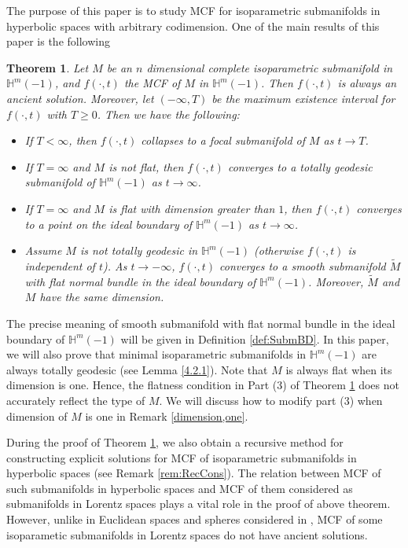 \documentclass[12pt]{article}
\newtheorem{thm}[lem]{Theorem}
\begin{document}
The purpose of this paper is to study MCF for isoparametric submanifolds in hyperbolic spaces with arbitrary codimension.
One of the  main results of this paper is the following

\begin{thm} \label{1.17}
  	Let $M$ be an $n$ dimensional complete  isoparametric submanifold in $\mathbb{H}^{m}(-1)$, and $f(\cdot,t)$ the  MCF of $M$ in $\mathbb{H}^{m}(-1)$. Then $f(\cdot,t)$ is always an ancient solution. Moreover, let $(-\infty,T)$ be the maximum existence interval for $f(\cdot,t)$ with
   $T \geq 0$. Then we have the following:
\begin{itemize}
\item[(1)] If $T< \infty$, then $f(\cdot,t)$ collapses to a focal submanifold of $M$  as $t\rightarrow T$.


\item[(2)] If $T= \infty$ and $M$ is not flat, then $f(\cdot,t)$ converges to a totally geodesic  submanifold of $\mathbb H^{m}(-1)$ as $t\rightarrow \infty$.


\item[(3)]
  If $T= \infty$ and $M$ is flat with dimension greater than $1$, then $f(\cdot,t)$ converges to a point on the ideal boundary of $\mathbb{H}^{m}(-1)$ as $t\rightarrow \infty$.



\item[(4)] Assume $M$ is not totally geodesic in $\mathbb{H}^m(-1)$ (otherwise $f(\cdot,t)$  is independent of $t$). As $t\rightarrow-\infty$, $f(\cdot,t)$ converges to a smooth submanifold  $\widetilde M$ with flat normal bundle in the ideal boundary of $\mathbb{H}^{m}(-1)$. Moreover, $\widetilde M$ and $M$ have the same dimension.
\end{itemize}
\end{thm}


\noindent
The precise meaning of smooth submanifold with flat normal bundle in the ideal boundary of $\mathbb{H}^{m}(-1)$ will be given in Definition \ref{def:SubmBD}. In this paper,
we will also prove that minimal isoparametric submanifolds in $\mathbb{H}^{m}(-1)$ are always totally geodesic (see Lemma \ref{4.2.1}).
Note that $M$ is always flat when its dimension is one. Hence, the flatness condition in Part (3) of Theorem \ref{1.17}
does not accurately reflect the type of $M$. We will discuss how to modify part (3) when dimension of $M$ is one
in Remark \ref{dimension,one}.

During the proof of Theorem \ref{1.17}, we also obtain a recursive method for constructing explicit solutions for MCF of
isoparametric submanifolds in hyperbolic spaces (see Remark \ref{rem:RecCons}). The relation between
MCF of such submanifolds in hyperbolic spaces and MCF of them considered as submanifolds in Lorentz spaces
plays a vital role in the proof of above theorem. However, unlike in Euclidean spaces and spheres considered in \cite{X.C}, MCF of some isoparametic submanifolds in Lorentz spaces do not have ancient solutions.
\end{document}

